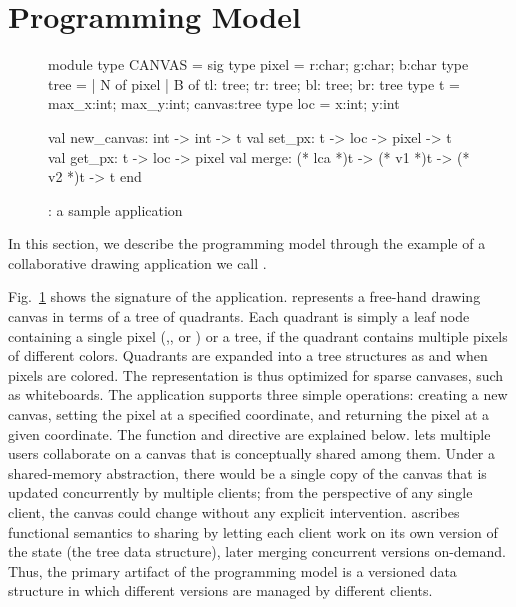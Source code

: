 \section{Programming Model}

\begin{figure}
\begin{center}
  \begin{ocaml}
  module type CANVAS = sig
    type pixel = {r:char; g:char; b:char}
    type tree = 
      | N of pixel
      | B of {tl: tree; tr: tree; bl: tree; br: tree} 
    type t = {max_x:int; max_y:int; canvas:tree} 
    type loc = {x:int; y:int}
  
    val new_canvas: int -> int -> t
    val set_px: t -> loc -> pixel -> t
    val get_px: t -> loc -> pixel
    val merge: (* lca *)t -> (* v1 *)t -> (* v2 *)t -> t
  end
  \end{ocaml}
\end{center}
\caption{\drawsome: a sample \name application}
\label{fig:canvas-sig}
\end{figure}

In this section, we describe the \name programming model through the
example of a collaborative drawing application we call \drawsome.

Fig.~\ref{fig:canvas-sig} shows the signature of the \drawsome
application. \drawsome represents a free-hand drawing canvas in terms
of a tree of quadrants.  Each quadrant is simply a leaf node
containing a single pixel (,, or ) or a tree, if the
quadrant contains multiple pixels of different colors. Quadrants are
expanded into a tree structures as and when pixels are colored.  The
representation is thus optimized for sparse canvases, such as
whiteboards. The application supports three simple operations:
creating a new canvas, setting the pixel at a specified coordinate,
and returning the pixel at a given coordinate. The  function
and  directive are explained below.
\drawsome lets multiple users collaborate on a canvas that is
conceptually shared among them. Under a shared-memory abstraction,
there would be a single copy of the canvas that is updated
concurrently by multiple clients; from the perspective of any single
client, the canvas could change without any explicit
intervention. \name ascribes functional semantics to sharing by
letting each client work on its own version of the state (the tree
data structure), later merging concurrent versions on-demand.  Thus,
the primary artifact of the \name programming model is a versioned
data structure in which different versions are managed by different
clients.

